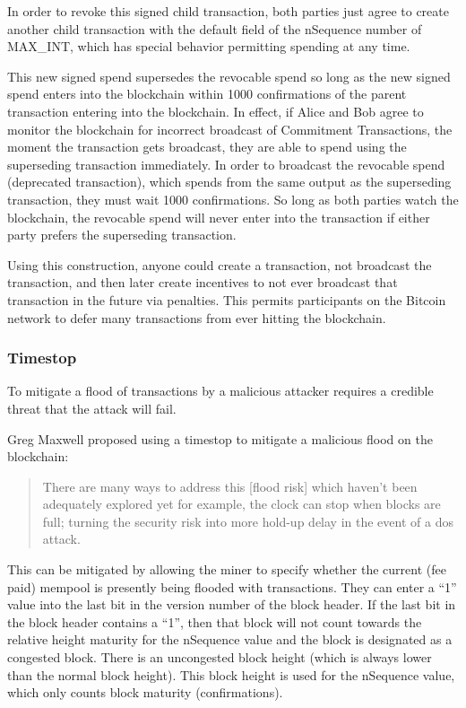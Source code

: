 \documentclass[letterpaper,11pt]{article}
\begin{document}
In order to revoke this signed child transaction, both parties just agree to
create another child transaction with the default field of the nSequence number
of MAX\_INT, which has special behavior permitting spending at any time.

This new signed spend supersedes the revocable spend so long as the new signed
spend enters into the blockchain within 1000 confirmations of the parent
transaction entering into the blockchain. In effect, if Alice and Bob agree to
monitor the blockchain for incorrect broadcast of Commitment Transactions, the
moment the transaction gets broadcast, they are able to spend using the
superseding transaction immediately. In order to broadcast the revocable spend
(deprecated transaction), which spends from the same output as the superseding
transaction, they must wait 1000 confirmations. So long as both parties watch
the blockchain, the revocable spend will never enter into the transaction if
either party prefers the superseding transaction.

Using this construction, anyone could create a transaction, not broadcast the
transaction, and then later create incentives to not ever broadcast that
transaction in the future via penalties. This permits participants on the
Bitcoin network to defer many transactions from ever hitting the blockchain.

\subsubsection{Timestop}

To mitigate a flood of transactions by a malicious attacker requires a credible
threat that the attack will fail. 

Greg Maxwell proposed using a timestop to mitigate a malicious flood on the
blockchain:

\begin{quote}
	There are many ways to address this [flood risk] which haven't been
	adequately explored yet \textemdash for example, the clock can stop
	when blocks are full; turning the security risk into more hold-up delay
	in the event of a dos attack.\cite{gregtimestop}
\end{quote}

This can be mitigated by allowing the miner to specify whether the current
(fee paid) mempool is presently being flooded with transactions. They can enter
a ``1'' value into the last bit in the version number of the block header. If
the last bit in the block header contains a ``1'', then that block will not
count towards the relative height maturity for the nSequence value and the block
is designated as a congested block. There is an uncongested block height (which
is always lower than the normal block height). This block height is used for the
nSequence value, which only counts block maturity (confirmations).
\end{document}
